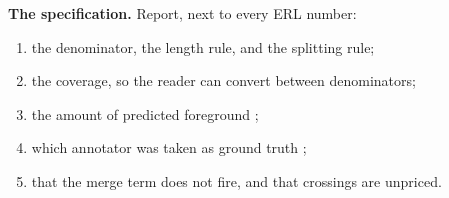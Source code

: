 \begin{table}[t]
  \centering
  \caption{Per-arm spread across the twelve cells, DRIVE, \specSeeds{} seeds.
  The largest honest effect any published topology loss produces in our own
  experiments, read at each arm's own dev-optimal threshold, is
  \specHonest{} points.}
  \label{tab:spread}
  \small
  
\end{table}


\noindent\textbf{The specification.} Report, next to every ERL number:
\begin{enumerate}
  \item the denominator, the length rule, and the splitting rule;
  \item the coverage, so the reader can convert between denominators;
  \item the amount of predicted foreground ;
  \item which annotator was taken as ground truth ;
  \item that the merge term does not fire, and that crossings are unpriced.
\end{enumerate}
